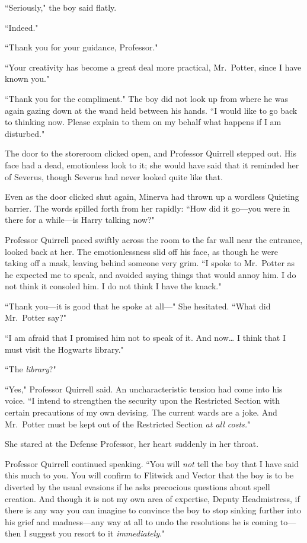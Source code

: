 ``Seriously," the boy said flatly.

``Indeed."

``Thank you for your guidance, Professor."

``Your creativity has become a great deal more practical, Mr.~Potter, since I have known you."

``Thank you for the compliment." The boy did not look up from where he was again gazing down at the wand held between his hands. ``I would like to go back to thinking now. Please explain to them on my behalf what happens if I am disturbed."

\later

The door to the storeroom clicked open, and Professor Quirrell stepped out. His face had a dead, emotionless look to it; she would have said that it reminded her of Severus, though Severus had never looked quite like that.

Even as the door clicked shut again, Minerva had thrown up a wordless Quieting barrier. The words spilled forth from her rapidly: ``How did it go—you were in there for a while—is Harry talking now?"

Professor Quirrell paced swiftly across the room to the far wall near the entrance, looked back at her. The emotionlessness slid off his face, as though he were taking off a mask, leaving behind someone very grim. ``I spoke to Mr.~Potter as he expected me to speak, and avoided saying things that would annoy him. I do not think it consoled him. I do not think I have the knack."

``Thank you—it is good that he spoke at all—" She hesitated. ``What did Mr.~Potter say?"

``I am afraid that I promised him not to speak of it. And now{\ldots} I think that I must visit the Hogwarts library."

``The \emph{library}?"

``Yes," Professor Quirrell said. An uncharacteristic tension had come into his voice. ``I intend to strengthen the security upon the Restricted Section with certain precautions of my own devising. The current wards are a joke. And Mr.~Potter must be kept out of the Restricted Section \emph{at all costs.}"

She stared at the Defense Professor, her heart suddenly in her throat.

Professor Quirrell continued speaking. ``You will \emph{not} tell the boy that I have said this much to you. You will confirm to Flitwick and Vector that the boy is to be diverted by the usual evasions if he asks precocious questions about spell creation. And though it is not my own area of expertise, Deputy Headmistress, if there is any way you can imagine to convince the boy to stop sinking further into his grief and madness—any way at all to undo the resolutions he is coming to—then I suggest you resort to it \emph{immediately}."

